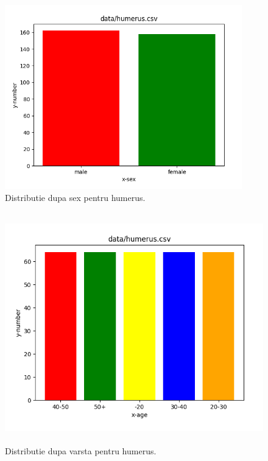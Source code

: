 \documentclass[runningheads,a4paper,11pt]{report}
\begin{document}
\begin{figure}[h!]
\centerline{\includegraphics[height=8cm]{Imagini/plot_humerus_sex.png}}
\caption{Distributie dupa sex pentru humerus.}
\label{fig}
\end{figure}

\begin{figure}[h!]
\centerline{\includegraphics[height=10cm]{Imagini/plot_humerus_age.png}}
\caption{Distributie dupa varsta pentru humerus.}
\label{fig}
\end{figure}
\end{document}
